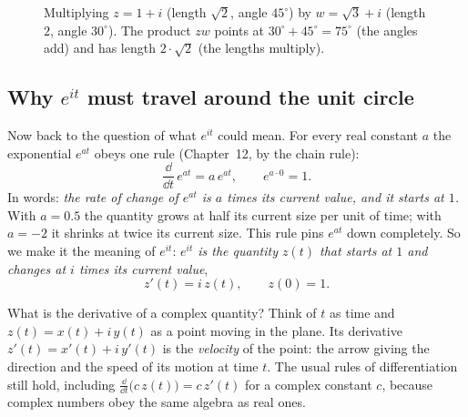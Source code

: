 \begin{figure}[htbp]
\centering
{}
\caption{Multiplying $z = 1+i$ (length $\sqrt2$, angle $45^\circ$) by $w = \sqrt3 + i$ (length $2$, angle $30^\circ$). The product $zw$ points at $30^\circ + 45^\circ = 75^\circ$ (the angles add) and has length $2 \cdot \sqrt2$ (the lengths multiply).}
\label{ch30:fig-multiply}
\end{figure}

\subsection{\texorpdfstring{Why $e^{it}$ must travel around the unit circle}{Why e to the it must travel around the unit circle}}
\label{ch30:sec-euler-circle}

Now back to the question of what $e^{it}$ could mean. For every real constant $a$ the exponential $e^{at}$ obeys one rule (Chapter~12, by the chain rule):
\[
  \frac{\dd}{\dd t}\,e^{at} = a\,e^{at}, \qquad e^{a\cdot 0} = 1.
\]
In words: \emph{the rate of change of $e^{at}$ is $a$ times its current value, and it starts at $1$.} With $a = 0.5$ the quantity grows at half its current size per unit of time; with $a = -2$ it shrinks at twice its current size. This rule pins $e^{at}$ down completely. So we make it the meaning of $e^{it}$: \emph{$e^{it}$ is the quantity $z(t)$ that starts at $1$ and changes at $i$ times its current value},
\begin{equation}
  z'(t) = i\,z(t), \qquad z(0) = 1.
  \label{ch30:eq-euler-rule}
\end{equation}

What is the derivative of a complex quantity? Think of $t$ as time and $z(t) = x(t) + i\,y(t)$ as a point moving in the plane. Its derivative $z'(t) = x'(t) + i\,y'(t)$ is the \emph{velocity} of the point: the arrow giving the direction and the speed of its motion at time $t$. The usual rules of differentiation still hold, including $\frac{\dd}{\dd t}\bigl(c\,z(t)\bigr) = c\,z'(t)$ for a complex constant $c$, because complex numbers obey the same algebra as real ones.

